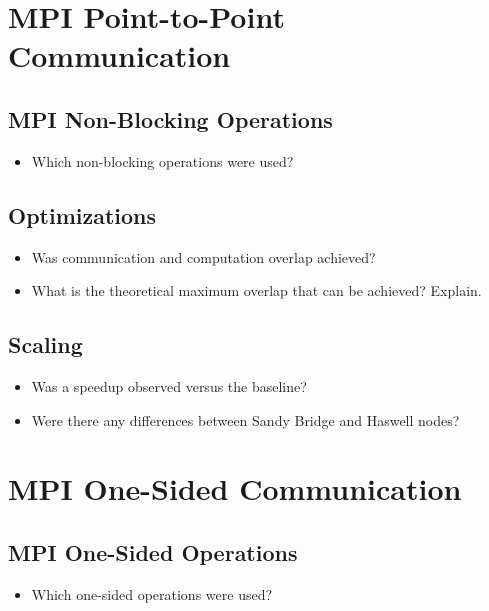 \documentclass[9pt,pdftex]{beamer}
\begin{document}
\section{MPI Point-to-Point Communication}
\begin{frame}{\phantom{Contents}}
\tableofcontents[
  currentsection  
]
\end{frame}
\subsection{MPI Non-Blocking Operations}
\begin{frame}{\insertsubsection}
\begin{itemize}
\item Which non-blocking operations were used?
\end{itemize}
\end{frame}
\subsection{Optimizations}
\begin{frame}{\insertsubsection}
\begin{itemize}
\item Was communication and computation overlap achieved?
\item What is the theoretical maximum overlap that can be achieved? Explain.
\end{itemize}
\end{frame}
\subsection{Scaling}
\begin{frame}{\insertsubsection}
\begin{itemize}
\item Was a speedup observed versus the baseline?
\item Were there any differences between Sandy Bridge and Haswell nodes?
\end{itemize}
\end{frame}

\section{MPI One-Sided Communication}
\begin{frame}{\phantom{Contents}}
\tableofcontents[
  currentsection  
]
\end{frame}
\subsection{MPI One-Sided Operations}
\begin{frame}{\insertsubsection}
\begin{itemize}
\item Which one-sided operations were used?
\end{itemize}
\end{frame}
\end{document}
